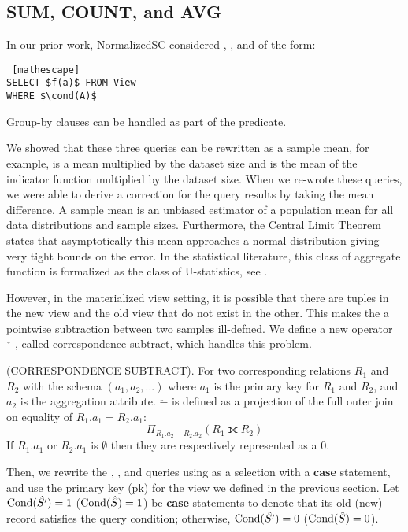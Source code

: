 \subsection{SUM, COUNT, and AVG}
In our prior work, NormalizedSC considered \sumfunc, \countfunc, and \avgfunc of the form:
\begin{lstlisting} [mathescape]
SELECT $f(a)$ FROM View 
WHERE $\cond(A)$
\end{lstlisting}
Group-by clauses can be handled as part of the predicate.

We showed that these three queries can be rewritten as a sample mean, for example, \sumfunc is a mean multiplied by the dataset size and \countfunc is the mean of the indicator function multiplied by the dataset size.
When we re-wrote these queries, we were able to derive a correction for the query results by taking the mean difference.
A sample mean is an unbiased estimator of a population mean for all data distributions and sample sizes.
Furthermore, the Central Limit Theorem states that asymptotically this mean approaches a normal distribution giving very tight bounds on the error.
In the statistical literature, this class of aggregate function is formalized as the class of U-statistics, see \cite{hoeffding1948class}.

However, in the materialized view setting, it is possible that there are tuples in the new view and the old view that do not exist in the other.
This makes the a pointwise subtraction between two samples ill-defned. 
We define a new operator $\check{-}$, called correspondence subtract, which handles this problem.
\begin{definition} (CORRESPONDENCE SUBTRACT). For two corresponding relations $R_1$ and $R_2$ with the schema $(a_1, a_2, ...)$ where 
$a_1$ is the primary key for $R_1$ and $R_2$, and $a_2$ is the aggregation attribute. 
$\check{-}$ is defined as a projection of the full outer join on equality of $R_1.a_1 = R_2.a_1$: \[ \Pi_{R_1.a_2 - R_2.a_2} ( R_1 \fullouterjoin R_2 ) \]
If $R_1.a_1$ or $R_2.a_1$ is $\emptyset$ then they are respectively represented as a $0$.
\end{definition}

Then, we rewrite the \sumfunc, \countfunc, and \avgfunc queries using as  a selection with a \textbf{case} statement, and use the primary key (pk) for the view we defined in the previous section.
Let $\textrm{Cond}(\hat{S'})=1$ ($\textrm{Cond}(\hat{S})=1$) be \textbf{case} statements to denote that its old (new) record satisfies the query condition; otherwise, $\textrm{Cond}(\hat{S'})=0$ ($\textrm{Cond}(\hat{S})=0$). 

